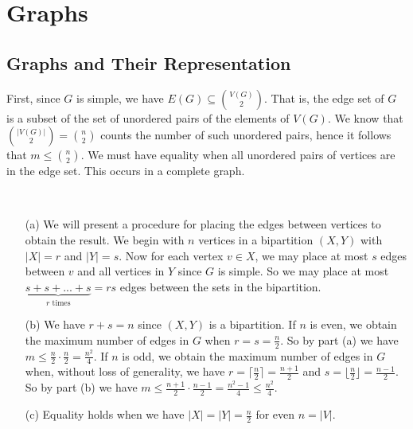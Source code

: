 \chapter{Graphs}

\section{Graphs and Their Representation}

\begin{ans}
First, since $G$ is simple, we have $E(G) \subseteq \binom{V(G)}{2}$. That is, the edge set of $G$ is a subset of the set of unordered pairs of the elements of $V(G)$. We know that $\binom{|V(G)|}{2} = \binom{n}{2}$ counts the number of such unordered pairs, hence it follows that $m \le \binom{n}{2}$. We must have equality when all unordered pairs of vertices are in the edge set. This occurs in a complete graph.
\end{ans}

\begin{ans} \
\begin{itemize}
	\item[(a)] We will present a procedure for placing the edges between vertices to obtain the result. We begin with $n$ vertices in a bipartition $(X,Y)$ with $|X| = r$ and $|Y| = s$. Now for each vertex $v \in X$, we may place at most $s$ edges between $v$ and all vertices in $Y$ since $G$ is simple. So we may place at most $\underbrace{s + s + ... + s}_\text{$r$ times} = rs$ edges between the sets in the bipartition.
	\item[(b)] We have $r + s = n$ since $(X,Y)$ is a bipartition. If $n$ is even, we obtain the maximum number of edges in $G$ when $r = s = \frac{n}{2}$. So by part (a) we have $m \le \frac{n}{2} \cdot \frac{n}{2} = \frac{n^2}{4}$. If $n$ is odd, we obtain the maximum number of edges in $G$ when, without loss of generality, we have $r = \lceil\frac{n}{2}\rceil = \frac{n+1}{2}$ and $s = \lfloor\frac{n}{2}\rfloor = \frac{n-1}{2}$. So by part (b) we have $m \le \frac{n+1}{2} \cdot \frac{n-1}{2} = \frac{n^2 - 1}{4} \leq \frac{n^2}{4}$.
	\item[(c)] Equality holds when we have $|X| = |Y| = \frac{n}{2}$ for even $n = |V|$.
\end{itemize}
\end{ans}

